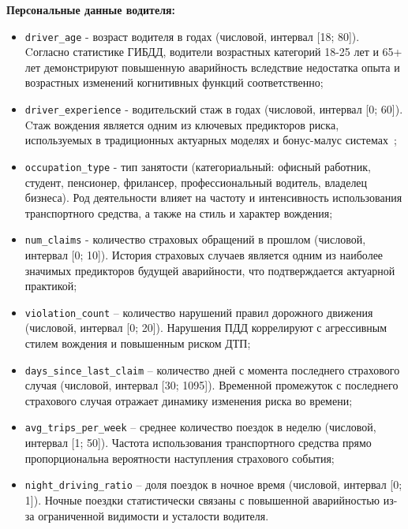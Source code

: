\textbf{Персональные данные водителя:}
\begin{itemize}
    \item \texttt{driver\_age} - возраст водителя в годах (числовой, интервал [18; 80]). Cогласно статистике ГИБДД, водители возрастных категорий 18-25 лет и 65+ лет демонстрируют повышенную аварийность вследствие недостатка опыта и возрастных изменений когнитивных функций соответственно;
    \item \texttt{driver\_experience} - водительский стаж в годах (числовой, интервал [0; 60]). Cтаж вождения является одним из ключевых предикторов риска, используемых в традиционных актуарных моделях и бонус-малус системах~\cite{ivanov2007risk};
    \item \texttt{occupation\_type} - тип занятости (категориальный: офисный работник, студент, пенсионер, фрилансер, профессиональный водитель, владелец бизнеса). Род деятельности влияет на частоту и интенсивность использования транспортного средства, а также на стиль и характер вождения;
    \item \texttt{num\_claims} - количество страховых обращений в прошлом (числовой, интервал [0; 10]). История страховых случаев является одним из наиболее значимых предикторов будущей аварийности, что подтверждается актуарной практикой;
    \item \texttt{violation\_count} – количество нарушений правил дорожного движения (числовой, интервал [0; 20]). Нарушения ПДД коррелируют с агрессивным стилем вождения и повышенным риском ДТП;
    \item \texttt{days\_since\_last\_claim} – количество дней с момента последнего страхового случая (числовой, интервал [30; 1095]). Временной промежуток с последнего страхового случая отражает динамику изменения риска во времени;
    \item \texttt{avg\_trips\_per\_week} – среднее количество поездок в неделю (числовой, интервал [1; 50]). Частота использования транспортного средства прямо пропорциональна вероятности наступления страхового события;
    \item \texttt{night\_driving\_ratio} – доля поездок в ночное время (числовой, интервал [0; 1]). Ночные поездки статистически связаны с повышенной аварийностью из-за ограниченной видимости и усталости водителя.
\end{itemize}

